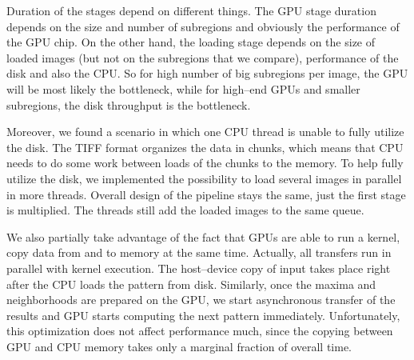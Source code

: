 Duration of the stages depend on different things. The GPU stage duration depends on the size and number of subregions and obviously the performance of the GPU chip. On the other hand, the loading stage depends on the size of loaded images (but not on the subregions that we compare), performance of the disk and also the CPU. So for high number of big subregions per image, the GPU will be most likely the bottleneck, while for high--end GPUs and smaller subregions, the disk throughput is the bottleneck. 

Moreover, we found a scenario in which one CPU thread is unable to fully utilize the disk. The TIFF format organizes the data in chunks, which means that CPU needs to do some work between loads of the chunks to the memory. To help fully utilize the disk, we implemented the possibility to load several images in parallel in more threads. Overall design of the pipeline stays the same, just the first stage is multiplied. The threads still add the loaded images to the same queue.

We also partially take advantage of the fact that GPUs are able to run a kernel, copy data from and to memory at the same time. Actually, all transfers run in parallel with kernel execution. The host--device copy of input takes place right after the CPU loads the pattern from disk. Similarly, once the maxima and neighborhoods are prepared on the GPU, we start asynchronous transfer of the results and GPU starts computing the next pattern immediately. Unfortunately, this optimization does not affect performance much, since the copying between GPU and CPU memory takes only a marginal fraction of overall time.






